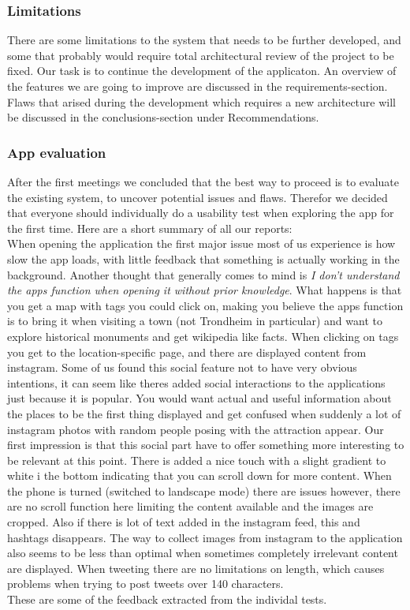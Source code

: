 		\subsubsection{Limitations}
There are some limitations to the system that needs to be further developed, and some that probably would require total architectural review of the project to be fixed. Our task is to continue the development of the applicaton. An overview of the features we are going to improve are discussed in the requirements-section. Flaws that arised during the development which requires a new architecture will be discussed in the conclusions-section under Recommendations.

		\subsubsection{App evaluation}
		
After the first meetings we concluded that the best way to proceed is to evaluate the existing system, to uncover potential issues and flaws.
Therefor we decided that everyone should individually do a usability test when exploring the app for the first time. Here are a short summary of all our reports:\\[3pt]

When opening the application the first major issue most of us experience is how slow the app loads, with little feedback that something is actually working in the background. Another thought that generally comes to mind is \emph{I don't understand the apps function when opening it without prior knowledge}. What happens is that you get a map with tags you could click on, making you believe the apps function is to bring it when visiting a town (not Trondheim in particular) and want to explore historical monuments and get wikipedia like facts. When clicking on tags you get to the location-specific page, and there are displayed content from instagram. Some of us found this social feature not to have very obvious intentions, it can seem like theres added social interactions to the applications just because it is popular. You would want actual and useful information about the places to be the first thing displayed and get confused when suddenly a lot of instagram photos with random people posing with the attraction appear. Our first impression is that this social part have to offer something more interesting to be relevant at this point. There is added a nice touch with a slight gradient to white i the bottom indicating that you can scroll down for more content. When the phone is turned (switched to landscape mode) there are issues however, there are no scroll function here limiting the content available and the images are cropped. Also if there is lot of text added in the instagram feed, this and hashtags disappears. The way to collect images from instagram to the application also seems to be less than optimal when sometimes completely irrelevant content are displayed. When tweeting there are no limitations on length, which causes problems when trying to post tweets over 140 characters.\\
These are some of the feedback extracted from the individal tests. 

